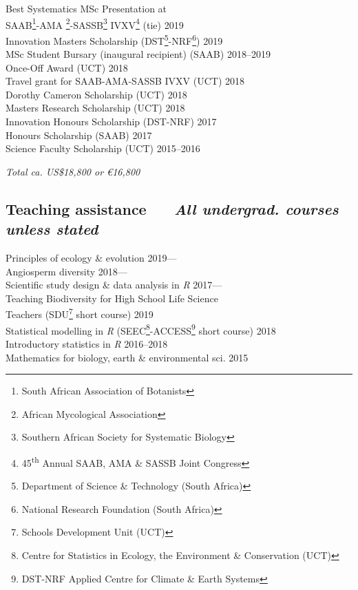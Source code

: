 \documentclass[10pt]{article}
\begin{document}
\begin{multicols}{2}
Best Systematics MSc Presentation at \\
\hspace{2em} SAAB\footnote{South African Association of Botanists}-AMA
  \footnote{African
  Mycological Association}-SASSB\footnote{Southern African Society for 
  Systematic Biology} IVXV\footnote{45\textsuperscript{th} Annual SAAB, AMA \& 
  SASSB Joint Congress} (tie)
  \hfill 2019 \\
Innovation Masters Scholarship {\footnotesize (DST\footnote{Department of 
  Science \& Technology (South Africa)}-NRF\footnote{National Research 
  Foundation (South Africa)})}
  \hfill 2019 \\
MSc Student Bursary (inaugural recipient) {\footnotesize (SAAB)}
  \hfill 2018--2019 \\
Once-Off Award {\footnotesize (UCT)}
  \hfill 2018 \\
Travel grant for SAAB-AMA-SASSB IVXV {\footnotesize (UCT)}
  \hfill 2018 \\
Dorothy Cameron Scholarship {\footnotesize (UCT)}
  \hfill 2018 \\
Masters Research Scholarship {\footnotesize (UCT)}
  \hfill 2018 \\
Innovation Honours Scholarship {\footnotesize (DST-NRF)}
  \hfill 2017 \\
Honours Scholarship {\footnotesize (SAAB)}
  \hfill 2017 \\
Science Faculty Scholarship {\footnotesize (UCT)}
  \hfill 2015--2016

\begin{center}
\textit{Total ca. US\$18,800 or €16,800}
\end{center}


\columnbreak

\subsection*{%
  Teaching assistance
  ~~{\footnotesize \textmd{\textit{
    All undergrad. courses unless stated
  }}}
}

Principles of ecology \& evolution
  \hfill 2019--- \\
Angiosperm diversity
  \hfill 2018--- \\
Scientific study design \& data analysis in \textit{R}
  \hfill 2017--- \\
Teaching Biodiversity for High School Life Science \\
  \hspace{2em} Teachers {\footnotesize
  (SDU\footnote{Schools Development Unit (UCT)} short course)}
  \hfill 2019 \\
Statistical modelling in \textit{R} {\footnotesize (SEEC\footnote{Centre for 
  Statistics in Ecology, the Environment \& Conservation (UCT)}-ACCESS\footnote{
  DST-NRF Applied Centre for Climate \& Earth Systems} short course)}
  \hfill 2018 \\
Introductory statistics in \textit{R}
  \hfill 2016--2018 \\
Mathematics for biology, earth \& environmental sci.
  \hfill 2015


\end{multicols}
\end{document}
